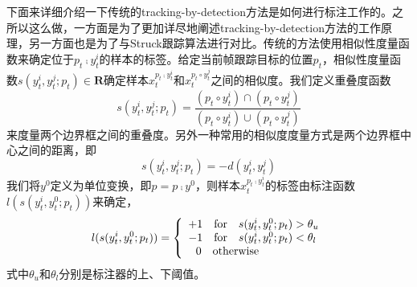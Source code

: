 下面来详细介绍一下传统的tracking-by-detection方法是如何进行标注工作的。之所以这么做，一方面是为了更加详尽地阐述tracking-by-detection方法的工作原理，另一方面也是为了与Struck跟踪算法进行对比。传统的方法使用相似性度量函数来确定位于${p_t} \comp y_t^i$的样本的标签。给定当前帧跟踪目标的位置$p_t$，相似性度量函数$s(y_t^i,y_t^j;p_t)\in\textbf{R}$确定样本$x_t^{{p_t} \comp y_t^i}$和$x_t^{{p_t} \circ y_t^j}$之间的相似度。我们定义重叠度函数
\begin{equation}
s(y_t^i,y_t^j;{p_t}) = \frac{{({p_t} \circ y_t^i) \cap ({p_t} \circ y_t^j)}}{{({p_t} \circ y_t^i) \cup ({p_t} \circ y_t^j)}}
\end{equation}
来度量两个边界框之间的重叠度。另外一种常用的相似度度量方式是两个边界框中心之间的距离，即 
\begin{equation}
s({y}_t^i,y_t^j;p_t) =  -d(y_t^i,y_t^j)
\end{equation}我们将$y^0$定义为单位变换，即$p=p \comp y^0$，则样本$x_t^{p_t \comp y_t^i}$的标签由标注函数$l(s(y_t^i,y_t^0;{p_t}))$来确定，
\begin{equation}
l(s(y_t^i,y_t^0;{p_t})) = \left\{ \begin{array}{l}

+1 \quad {\rm{for}}\quad s(y_t^i,y_t^0;{p_t}) > {\theta _u}\\

-1 \quad {\rm{for}} \quad s(y_t^i,y_t^0;{p_t}) < {\theta _l}\\

{\rm{\ \ }}0 \quad {\rm{ otherwise}}

\end{array} \right.
\end{equation}
式中$\theta_u$和$\theta_l$分别是标注器的上、下阈值。

